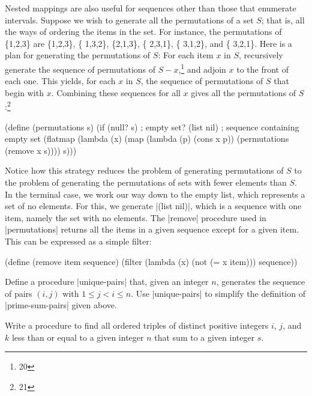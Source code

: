 \begin{Exercise}
Nested mappings are also useful for sequences other than those that
enumerate intervals.  Suppose we wish to generate all the permutations
of a set $S$; that is, all the ways of ordering the items in the set.
For instance, the permutations of \{1,2,3\} are \{1,2,3\}, \{ 1,3,2\},
\{2,1,3\}, \{ 2,3,1\}, \{ 3,1,2\}, and \{ 3,2,1\}.  Here is a plan for
generating the permutations of $S$: For each item $x$ in $S$,
recursively generate the sequence of permutations of $S
-x$,\footnote{20} and adjoin $x$ to the front of each one.  This
yields, for each $x$ in $S$, the sequence of permutations of $S$ that
begin with $x$.  Combining these sequences for all $x$ gives all the
permutations of $S$:\footnote{21}


\begin{schemedisplay}
(define (permutations s)
  (if (null? s)                    ; empty set?
      (list nil)                   ; sequence containing empty set
      (flatmap (lambda (x)
                 (map (lambda (p) (cons x p))
                      (permutations (remove x s))))
               s)))
\end{schemedisplay}
Notice how this strategy reduces the problem of generating
permutations of $S$ to the problem of generating the permutations of
sets with fewer elements than $S$.  In the terminal case, we work our
way down to the empty list, which represents a set of no elements.
For this, we generate \scheme|(list nil)|, which is a sequence with one
item, namely the set with no elements.  The \scheme|remove| procedure
used in \scheme|permutations| returns all the items in a given sequence
except for a given item.  This can be expressed as a simple filter:

\begin{schemedisplay}
(define (remove item sequence)
  (filter (lambda (x) (not (= x item)))
          sequence))
\end{schemedisplay}

\begin{Exercise}
\label{exc:2.40}
Define a procedure \scheme|unique-pairs| that, given an integer $n$,
generates the sequence of pairs $(i,j)$ with $ 1 \le j < i \le n$.
Use \scheme|unique-pairs| to simplify the definition of
\scheme|prime-sum-pairs| given above.
\end{Exercise}

\begin{Exercise}
\label{exc:2.41}
Write a procedure to find all ordered
triples of distinct positive integers $i$, $j$, and $k$ less than or
equal to a given integer $n$ that sum to a given integer $s$.
\end{Exercise}



\end{Exercise}
